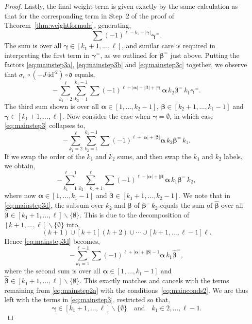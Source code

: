 \documentclass[10pt,a4paper]{amsart}
\newcommand*{\balpha}{\boldsymbol{\alpha}}
\newcommand*{\bbeta}{\boldsymbol{\beta}}
\newcommand*{\bgamma}{\boldsymbol{\gamma}}
\newcommand*{\cendot}{\boldsymbol{\cdot}}
\newcommand*{\df}{\mathfrak d}
\newcommand*{\id}{{\mathrm{id}}}
\begin{document}
\begin{proof}
Lastly, the final weight term is given exactly by the same calculation as that for the corresponding term in Step~2 of the proof of Theorem~\ref{thm:weightformula}, generating,
\begin{equation}\label{eq:mainstep3c}
    \sum(-1)^{\ell-k_1+|\bgamma|}\bgamma^=.
\end{equation}
The sum is over all $\bgamma\in[k_1+1,\ldots,\ell]$, and similar care is required in interpreting the first term in $\bgamma^=$, as we outlined for $\bbeta^=$ just above. 
Putting the factors \eqref{eq:mainstep3a}, \eqref{eq:mainstep3b} and \eqref{eq:mainstep3c} together, we observe that $\sigma_n\circ(-J\cendot\id^{\cendot2})\circ\df$ equals,
\begin{equation}\label{eq:mainstep3}
   -\sum_{k_1=2}^\ell\sum_{k_2=1}^{k_1-1}\sum(-1)^{\ell+|\balpha|+|\bbeta|+|\bgamma|}\balpha\,k_2\bbeta^=\,k_1\bgamma^=.
\end{equation}
The third sum shown is over all $\balpha\in[1,\ldots,k_2-1]$, $\bbeta\in[k_2+1,\ldots,k_1-1]$ and $\bgamma\in[k_1+1,\ldots,\ell]$.
Now consider the case when $\bgamma=\emptyset$, in which case \eqref{eq:mainstep3} collapses to,
\begin{equation*}
   -\sum_{k_1=2}^\ell\sum_{k_2=1}^{k_1-1}\sum(-1)^{\ell+|\balpha|+|\bbeta|}\balpha\,k_2\bbeta^=\,k_1.
\end{equation*}
If we swap the order of the $k_1$ and $k_2$ sums, and then swap the $k_1$ and $k_2$ labels, we obtain,
\begin{equation}\label{eq:mainstep3d}
   -\sum_{k_1=1}^{\ell-1}\sum_{k_2=k_1+1}^{\ell}\sum(-1)^{\ell+|\balpha|+|\bbeta|}\balpha\,k_1\bbeta^=\,k_2,
\end{equation}
where now $\balpha\in[1,\ldots,k_1-1]$ and $\bbeta\in[k_1+1,\ldots,k_2-1]$.
We note that in \eqref{eq:mainstep3d}, the subsum over $k_2$ and $\bbeta$ of $\bbeta^=\,k_2$ equals the sum of $\hat{\bbeta}$
over all $\hat{\bbeta}\in[k_1+1,\ldots,\ell]\backslash\{\emptyset\}$. This is due to the decomposition of $[k+1,\ldots,\ell]\backslash\{\emptyset\}$ into,
\begin{equation}\label{eq:decomp}
(k+1)\cup[k+1](k+2)\cup\cdots\cup[k+1,\ldots,\ell-1]\ell.
\end{equation}
Hence \eqref{eq:mainstep3d} becomes,
\begin{equation}\label{eq:mainstep3e}
   -\sum_{k_1=1}^{\ell-1}\sum(-1)^{\ell+|\balpha|+|\bbeta|-1}\balpha\,k_1\hat{\bbeta}^=,
\end{equation}
where the second sum is over all $\balpha\in[1,\ldots,k_1-1]$ and $\hat{\bbeta}\in[k_1+1,\ldots,\ell]\backslash\{\emptyset\}$.
This exactly matches and cancels with the terms remaining from \eqref{eq:mainstep2a} with the conditions~\eqref{eq:mainconds2}.
We are thus left with the terms in \eqref{eq:mainstep3}, restricted so that,
\begin{equation}\label{eq:mainconds3}
\bgamma\in[k_1+1,\ldots,\ell]\backslash\{\emptyset\}\quad\text{and}\quad k_1\in2,\ldots,\ell-1. 
\end{equation}


\end{proof}
\end{document}
